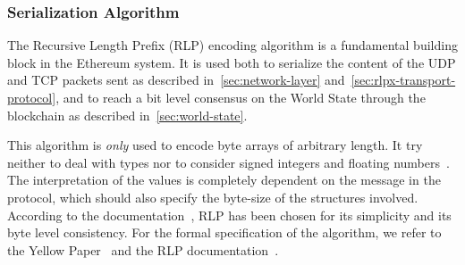 \subsubsection{Serialization Algorithm}
\label{sec:marshaling}

The Recursive Length Prefix (RLP) encoding algorithm is a fundamental building
block in the Ethereum system. It is used both to serialize the content of the
UDP and TCP packets sent as described in~\autoref{sec:network-layer}
and~\autoref{sec:rlpx-transport-protocol}, and to reach a bit level consensus on
the World State through the blockchain as described
in~\autoref{sec:world-state}.

This algorithm is \emph{only} used to encode byte arrays of arbitrary length. It
try neither to deal with types nor to consider signed integers and floating
numbers~\cite{wood2018ethereum}. The interpretation of the values is completely
dependent on the message in the protocol, which should also specify the
byte-size of the structures involved. According to the
documentation~\cite{bib:design-rationale}, RLP has been chosen for its
simplicity and its byte level consistency. For the formal specification of the
algorithm, we refer to the Yellow Paper~\cite[Appendix B]{wood2018ethereum} and
the RLP documentation~\cite{bib:ethereumrlpspec}.
